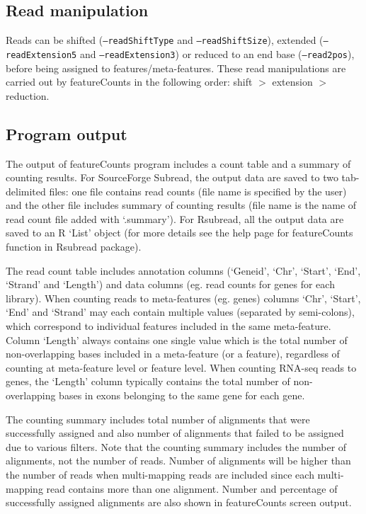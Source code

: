\documentclass[12pt]{report}
\newcommand{\code}[1]{{\small\texttt{#1}}}
\newcommand{\Subread}{\textsf{Subread}}
\newcommand{\Rsubread}{\textsf{Rsubread}}
\newcommand{\featureCounts}{\textsf{featureCounts}}
\newcommand{\R}{\textsf{R}}
\begin{document}
\subsection{Read manipulation}

Reads can be shifted (\code{--readShiftType} and \code{--readShiftSize}), extended (\code{--readExtension5} and \code{--readExtension3}) or reduced to an end base (\code{--read2pos}), before being assigned to features/meta-features.
These read manipulations are carried out by {\featureCounts} in the following order: shift $>$ extension $>$ reduction. 


\subsection{Program output}
\label{sec:program_output}

The output of {\featureCounts} program includes a count table and a summary of counting results.
For SourceForge {\Subread}, the output data are saved to two tab-delimited files: one file contains read counts (file name is specified by the user) and the other file includes summary of counting results (file name is the name of read count file added with `.summary').
For {\Rsubread}, all the output data are saved to an {\R} `List' object (for more details see the help page for {\featureCounts} function in {\Rsubread} package). 

The read count table includes annotation columns (`Geneid', `Chr', `Start', `End', `Strand' and `Length') and data columns (eg. read counts for genes for each library).
When counting reads to meta-features (eg. genes) columns `Chr', `Start', `End' and `Strand' may each contain multiple values (separated by semi-colons), which correspond to individual features included in the same meta-feature. 
Column `Length' always contains one single value which is the total number of non-overlapping bases included in a meta-feature (or a feature), regardless of counting at meta-feature level or feature level.
When counting RNA-seq reads to genes, the `Length' column typically contains the total number of non-overlapping bases in exons belonging to the same gene for each gene.

The counting summary includes total number of alignments that were successfully assigned and also number of alignments that failed to be assigned due to various filters.
Note that the counting summary includes the number of alignments, not the number of reads.
Number of alignments will be higher than the number of reads when multi-mapping reads are included since each multi-mapping read contains more than one alignment.
Number and percentage of successfully assigned alignments are also shown in featureCounts screen output.
\end{document}
